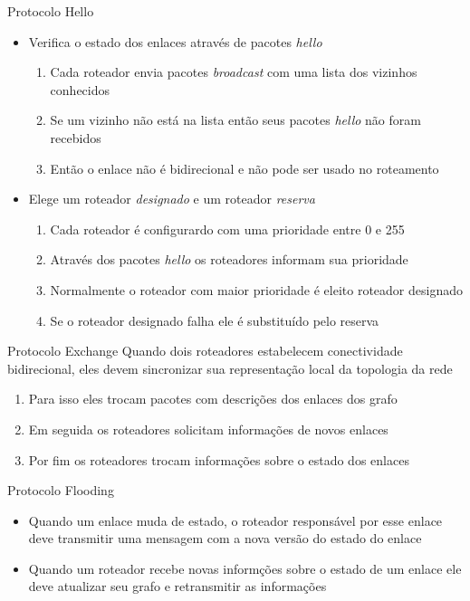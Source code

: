 \documentclass{beamer}
\newlength{\wideitemsep}
\let\olditem\item
\renewcommand{\item}{\setlength{\itemsep}{\wideitemsep}\olditem}
\begin{document}
\begin{frame}{Protocolo Hello}
\begin{itemize}
 \item Verifica o estado dos enlaces através de pacotes \textit{hello} %
  \begin{enumerate}
   \olditem Cada roteador envia pacotes \textit{broadcast} com uma lista dos vizinhos conhecidos %
   \olditem Se um vizinho não está na lista então seus pacotes \textit{hello} não foram recebidos %
   \olditem Então o enlace não é bidirecional e não pode ser usado no roteamento %
  \end{enumerate}
 \item Elege um roteador \textit{designado} e um roteador \textit{reserva} %
  \begin{enumerate}
   \olditem Cada roteador é configurardo com uma prioridade entre 0 e 255 %
   \olditem Através dos pacotes \textit{hello} os roteadores informam sua prioridade %
   \olditem Normalmente o roteador com maior prioridade é eleito roteador designado %
   \olditem Se o roteador designado falha ele é substituído pelo reserva %
  \end{enumerate}
\end{itemize}
\end{frame}

\begin{frame}{Protocolo Exchange}
Quando dois roteadores estabelecem conectividade bidirecional, eles devem sincronizar sua representação local da topologia da rede %
 \begin{enumerate}
  \olditem Para isso eles trocam pacotes com descrições dos enlaces dos grafo %
  \olditem Em seguida os roteadores solicitam informações de novos enlaces %
  \olditem Por fim os roteadores trocam informações sobre o estado dos enlaces %
 \end{enumerate}
\end{frame}

\begin{frame}{Protocolo Flooding}
\begin{itemize}
 \item Quando um enlace muda de estado, o roteador responsável por esse enlace deve transmitir uma mensagem com a nova versão do estado do enlace %
 \item Quando um roteador recebe novas informções sobre o estado de um enlace ele deve atualizar seu grafo e retransmitir as informações  %
\end{itemize}
\end{frame}
\end{document}
